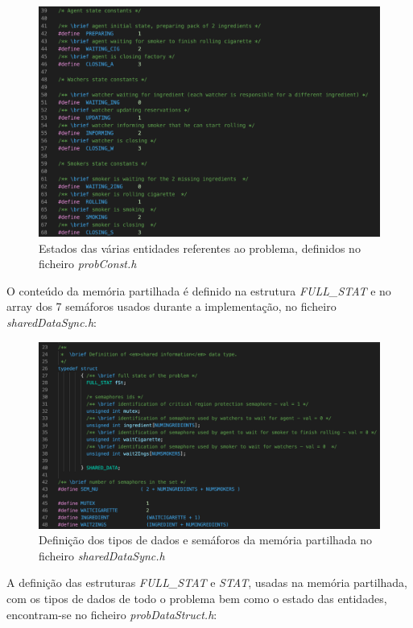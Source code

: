 \documentclass[10pt,portuguese]{article}
\begin{document}
\begin{figure}[!h]
    \centering
    \includegraphics[width=\textwidth]{images/Problem/estados.png}
    \caption{Estados das várias entidades referentes ao problema, definidos no ficheiro \textit{probConst.h}}
\end{figure}
\clearpage
\par O conteúdo da memória partilhada é definido na estrutura \textit{FULL\_STAT} e no array dos 7 semáforos usados durante a implementação, no ficheiro \textit{sharedDataSync.h}:
\begin{figure}[!h]
    \centering
    \includegraphics[width=\textwidth]{images/Problem/sharedmem.png}
    \caption{Definição dos tipos de dados e semáforos da memória partilhada no ficheiro \textit{sharedDataSync.h}}
\end{figure}
\clearpage
\par A definição das estruturas \textit{FULL\_STAT} e \textit{STAT}, usadas na memória partilhada, com os tipos de dados de todo o problema bem como o estado das entidades, encontram-se no ficheiro \textit{probDataStruct.h}:
\end{document}
